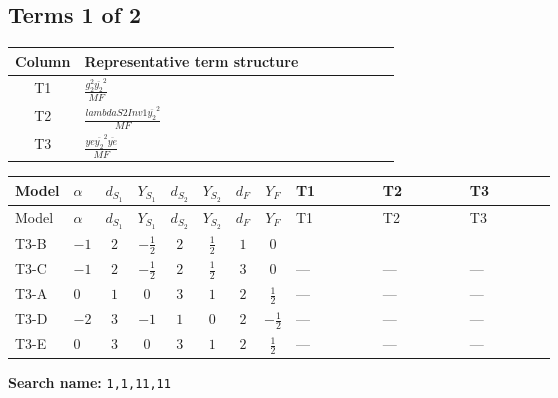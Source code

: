 \documentclass[8pt]{article}
\begin{document}
\begin{landscape}
\subsection*{Terms 1 of 2}
\begin{center}
\begin{tabular}{@{}c >{\raggedright\arraybackslash}p{0.82\linewidth}@{}}
\toprule
Column & Representative term structure \\
\midrule
T1 & \(\displaystyle \frac{g_{2}^{2} \overline{y_{2}}^{2}}{MF}\) \\
\midrule
T2 & \(\displaystyle \frac{lambdaS2Inv1 \overline{y_{2}}^{2}}{MF}\) \\
\midrule
T3 & \(\displaystyle \frac{ye \overline{y_{2}}^{2} \overline{ye}}{MF}\) \\
\midrule
\bottomrule
\end{tabular}
\end{center}
\smallskip
\tiny
\begin{longtable}{@{}llcccccc >{\raggedright\arraybackslash}p{0.21\linewidth} >{\raggedright\arraybackslash}p{0.21\linewidth} >{\raggedright\arraybackslash}p{0.21\linewidth}@{}}
\toprule
Model & $\alpha$ & $d_{S_1}$ & $Y_{S_1}$ & $d_{S_2}$ & $Y_{S_2}$ & $d_F$ & $Y_F$ & T1 & T2 & T3 \\
\midrule
\endfirsthead
\toprule
Model & $\alpha$ & $d_{S_1}$ & $Y_{S_1}$ & $d_{S_2}$ & $Y_{S_2}$ & $d_F$ & $Y_F$ & T1 & T2 & T3 \\
\midrule
\endhead
T3-B & $-1$ & $2$ & $-\frac{1}{2}$ & $2$ & $\frac{1}{2}$ & $1$ & $0$ & \scriptsize\adjustbox{max width=\linewidth}{$\begin{gathered} - \frac{3 g_{2}^{2} \overline{y_{2}}^{2}}{4 MF}\end{gathered}$} & \scriptsize\adjustbox{max width=\linewidth}{$\begin{gathered} - \frac{lambdaS2Inv1 \overline{y_{2}}^{2}}{2 MF}\end{gathered}$} & \scriptsize\adjustbox{max width=\linewidth}{$\begin{gathered} \frac{ye \overline{y_{2}}^{2} \overline{ye}}{4 MF}\end{gathered}$} \\
\midrule
T3-C & $-1$ & $2$ & $-\frac{1}{2}$ & $2$ & $\frac{1}{2}$ & $3$ & $0$ & --- & --- & --- \\
\midrule
T3-A & $0$ & $1$ & $0$ & $3$ & $1$ & $2$ & $\frac{1}{2}$ & --- & --- & --- \\
\midrule
T3-D & $-2$ & $3$ & $-1$ & $1$ & $0$ & $2$ & $-\frac{1}{2}$ & --- & --- & --- \\
\midrule
T3-E & $0$ & $3$ & $0$ & $3$ & $1$ & $2$ & $\frac{1}{2}$ & --- & --- & --- \\
\midrule
\bottomrule
\end{longtable}
\clearpage
\noindent\textbf{Search name: }\texttt{1,1,11,11}\par\smallskip

\end{landscape}
\end{document}
